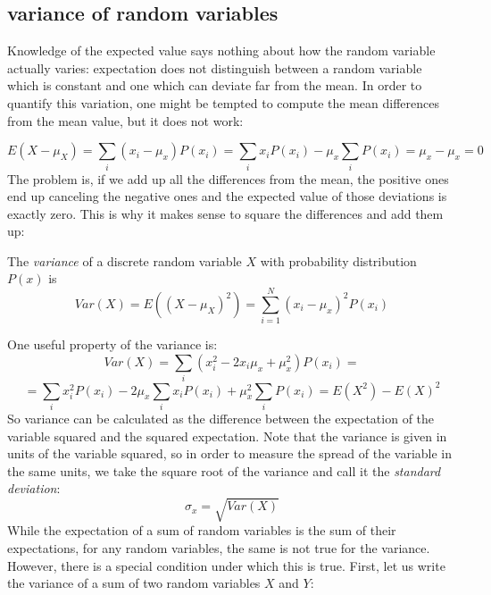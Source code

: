 \documentclass[
  letterpaper,
  DIV=11,
  numbers=noendperiod]{scrreprt}
\begin{document}
\hypertarget{variance-of-random-variables}{%
\subsection{variance of random
variables}\label{variance-of-random-variables}}

Knowledge of the expected value says nothing about how the random
variable actually varies: expectation does not distinguish between a
random variable which is constant and one which can deviate far from the
mean. In order to quantify this variation, one might be tempted to
compute the mean differences from the mean value, but it does not work:

\[ E(X-\mu_X) =  \sum_i (x_i-\mu_x)P(x_i) = \sum_i x_i P(x_i) - \mu_x \sum_i P(x_i) = \mu_x - \mu_x = 0\]
The problem is, if we add up all the differences from the mean, the
positive ones end up canceling the negative ones and the expected value
of those deviations is exactly zero. This is why it makes sense to
square the differences and add them up:

\begin{tcolorbox}[enhanced jigsaw, coltitle=black, arc=.35mm, opacitybacktitle=0.6, breakable, bottomtitle=1mm, toptitle=1mm, titlerule=0mm, colback=white, leftrule=.75mm, rightrule=.15mm, colframe=quarto-callout-note-color-frame, colbacktitle=quarto-callout-note-color!10!white, opacityback=0, title=\textcolor{quarto-callout-note-color}{\faInfo}\hspace{0.5em}{Definition}, left=2mm, toprule=.15mm, bottomrule=.15mm]

The \emph{variance} of a discrete random variable \(X\) with probability
distribution \(P(x)\) is
\[ Var(X) = E((X-\mu_X)^2) = \sum_{i=1}^N (x_i-\mu_x)^2P(x_i)\]

\end{tcolorbox}

One useful property of the variance is:
\[ Var(X) = \sum_i (x_i^2 - 2x_i\mu_x + \mu_x^2)P(x_i) =\]
\[= \sum_i x_i^2 P(x_i) - 2\mu_x\sum_i x_i P(x_i) + \mu_x^2 \sum_i P(x_i) = E(X^2) - E(X)^2 \]
So variance can be calculated as the difference between the expectation
of the variable squared and the squared expectation. Note that the
variance is given in units of the variable squared, so in order to
measure the spread of the variable in the same units, we take the square
root of the variance and call it the \emph{standard deviation}:
\[\sigma_x = \sqrt{Var(X)}\] While the expectation of a sum of random
variables is the sum of their expectations, for any random variables,
the same is not true for the variance. However, there is a special
condition under which this is true. First, let us write the variance of
a sum of two random variables \(X\) and \(Y\):
\end{document}
